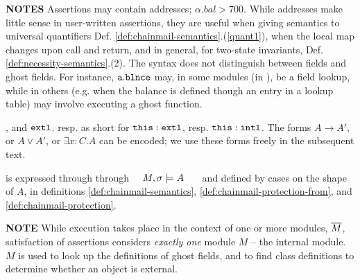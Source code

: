 \noindent
\textbf{NOTES}  \notesep %
 Assertions  may contain addresses; \eg   $\alpha.bal > 700$. 
{While addresses make little sense in user-written assertions, they are useful when giving semantics to universal quantifiers 
\cf Def. \ref{def:chainmail-semantics}.(\ref{quant1}), {when the local map changes \eg upon call and return, and in general,} for two-state invariants, \cf Def. \ref{def:necessity-semantics}.(2).}
\notesep The syntax does  not distinguish between fields and ghost fields. For instance, $\mbox{\normalfont{\texttt{a}}}.\mbox{\normalfont{\texttt{\mbox{\normalfont{\texttt{blnce}}}}}}$ may, in some modules (\eg in \ModA), be a field lookup, while in others (e.g. when the balance is defined though an entry in a lookup table) may involve executing a ghost function. 


\begin{definition}[Shorthands] 
, and
$\mbox{\normalfont{\texttt{extl}}}$. resp. \sdN{$\intThis$} as  short  for $\mbox{\normalfont{\texttt{this}}}:\mbox{\normalfont{\texttt{extl}}}$, resp. $\mbox{\normalfont{\texttt{this}}}:\mbox{\normalfont{\texttt{intl}}}$.%
The forms $A \rightarrow A'$, or $A \vee A'$, or $\exists x:C.A$  can be encoded; we use these forms freely in the subsequent text.
\end{definition}



\begin{definition} 
\label{def:chainmail-semantics-all}
\label{def:chainmail-semantics}
is expressed through  through \ \ $M , \sigma \models {A}$ \ \ \ and defined by cases on the shape of $A$, in definitions \ref{def:chainmail-semantics}, \ref{def:chainmail-protection-from}, and 
 \ref{def:chainmail-protection}.
\end{definition}

\noindent
\textbf{NOTE}  While execution takes place in the context of one or more modules, $\overline{M}$, satisfaction of assertions considers \emph{exactly one} module  $M$ -- the internal module. 
{$M$} is used %
 to look up the definitions of ghost fields, and to find class definitions to determine whether an object is  external.

